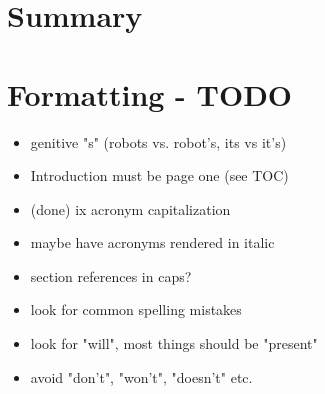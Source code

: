 \chapter{Summary}

\chapter{Formatting - TODO}

\begin{itemize}
  \item genitive "s" (robots vs. robot's, its vs it's)
  \item Introduction must be page one (see TOC)
  \item (done) ix acronym capitalization
  \item maybe have acronyms rendered in italic
  \item section references in caps?
  \item look for common spelling mistakes
  \item look for "will", most things should be "present"
  \item avoid "don't", "won't", "doesn't" etc.
\end{itemize}
